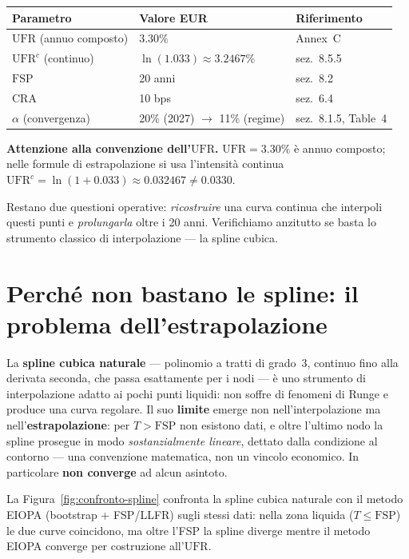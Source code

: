 \documentclass[11pt,a4paper]{article}
\theoremstyle{plain}
\theoremstyle{definition}
\theoremstyle{remark}
\newcommand{\UFR}{\mathrm{UFR}}
\newcommand{\FSP}{\mathrm{FSP}}
\newcommand{\CRA}{\mathrm{CRA}}
\begin{document}
\begin{keybox}
\begin{center}
\renewcommand{\arraystretch}{1.25}
\begin{tabular}{lll}
\toprule
\textbf{Parametro} & \textbf{Valore EUR} & \textbf{Riferimento} \\
\midrule
$\UFR$ (annuo composto) & $3.30\%$ & Annex~C \\
$\UFR^c$ (continuo) & $\ln(1.033) \approx 3.2467\%$ & sez.~8.5.5 \\
$\FSP$ & 20 anni & sez.~8.2 \\
$\CRA$ & 10 bps & sez.~6.4 \\
$\alpha$ (convergenza) & 20\% (2027) $\to$ 11\% (regime) & sez.~8.1.5, Table~4 \\
\bottomrule
\end{tabular}
\end{center}
\textbf{Attenzione alla convenzione dell'$\UFR$.} $\UFR=3.30\%$ \`e annuo composto; nelle
formule di estrapolazione si usa l'intensit\`a continua
$\UFR^c=\ln(1+0.033)\approx 0.032467 \neq 0.0330$.
\end{keybox}

Restano due questioni operative: \emph{ricostruire} una curva continua che interpoli questi
punti e \emph{prolungarla} oltre i 20 anni. Verifichiamo anzitutto se basta lo strumento
classico di interpolazione --- la spline cubica.

\section{Perch\'e non bastano le spline: il problema dell'estrapolazione}
\label{sec:spline}

La \textbf{spline cubica naturale} --- polinomio a tratti di grado~3, continuo fino alla
derivata seconda, che passa esattamente per i nodi --- \`e uno strumento di interpolazione
adatto ai pochi punti liquidi: non soffre di fenomeni di Runge e produce una curva regolare.
Il suo \textbf{limite} emerge non nell'interpolazione ma nell'\textbf{estrapolazione}: per
$T>\FSP$ non esistono dati, e oltre l'ultimo nodo la spline prosegue in modo
\emph{sostanzialmente lineare}, dettato dalla condizione al contorno --- una convenzione
matematica, non un vincolo economico. In particolare \textbf{non converge} ad alcun asintoto.

La Figura~\ref{fig:confronto-spline} confronta la spline cubica naturale con il metodo EIOPA
(bootstrap + FSP/LLFR) sugli stessi dati: nella zona liquida ($T\le\FSP$) le due curve
coincidono, ma oltre l'FSP la spline diverge mentre il metodo EIOPA converge per costruzione
all'$\UFR$.
\end{document}
